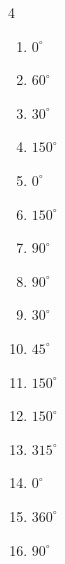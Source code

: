 \begin{multicols}{4}
\begin{enumerate}
  \item $\displaystyle 0^{\circ}$
        \phantom{$\displaystyle =0$}

  \item $\displaystyle 60^{\circ}$

  \item $\displaystyle 30^{\circ}$

  \item $\displaystyle 150^{\circ}$

  \item $\displaystyle 0^{\circ}$
        \phantom{$\displaystyle =0$}

  \item $\displaystyle 150^{\circ}$

  \item $\displaystyle 90^{\circ}$

  \item $\displaystyle 90^{\circ}$

  \item $\displaystyle 30^{\circ}$

  \item $\displaystyle 45^{\circ}$

  \item $\displaystyle 150^{\circ}$

  \item $\displaystyle 150^{\circ}$

  \item $\displaystyle 315^{\circ}$

  \item $\displaystyle 0^{\circ}$
        \phantom{$\displaystyle =0$}

  \item $\displaystyle 360^{\circ}$
        \phantom{$\displaystyle =2\pi$}

  \item $\displaystyle 90^{\circ}$


\end{enumerate}
\end{multicols}
